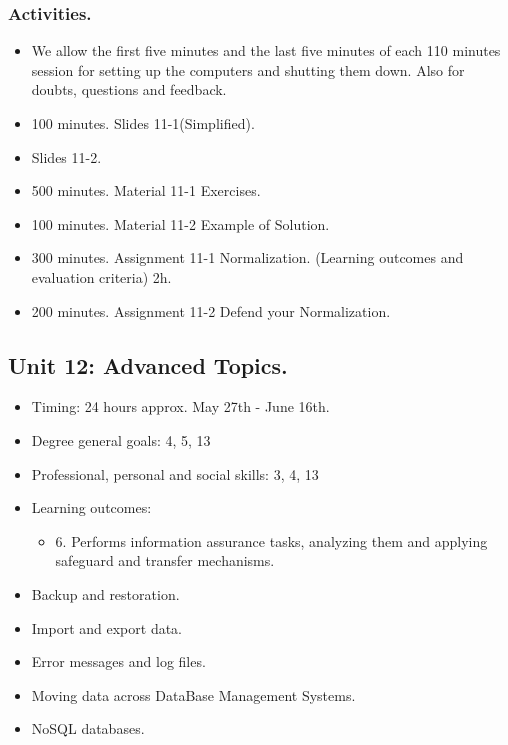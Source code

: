 \documentclass[catalan, a4paper, 12pt, titlepage]{article}
\begin{document}
  \subsubsection{Activities.}
  \begin{itemize}
          \item We allow the first five minutes and the last five minutes of each 110 minutes session for setting up the computers and shutting them down. Also for doubts, questions and feedback.
	  \item 100 minutes. Slides 11-1(Simplified).
	  \item Slides 11-2.
	  \item 500 minutes. Material 11-1 Exercises.
	  \item 100 minutes. Material 11-2 Example of Solution.
	  \item 300 minutes. Assignment 11-1 Normalization. (\faGraduationCap Learning outcomes and evaluation criteria) 2h.
	  \item 200 minutes. Assignment 11-2 Defend your Normalization.
  \end{itemize}


  \subsection{Unit 12: Advanced Topics.}

  \begin{itemize}
	\item Timing: 24 hours approx. May 27th - June 16th.
	\item Degree general goals: 4, 5, 13
	\item Professional, personal and social skills: 3, 4, 13
	\item Learning outcomes: 
		\begin{itemize}
			\item 6. Performs information assurance tasks, analyzing them and applying safeguard and transfer mechanisms.
		\end{itemize}
  \end{itemize}

  \begin{itemize}
	\item Backup and restoration.
	\item Import and export data.
	\item Error messages and log files.
	\item Moving data across DataBase Management Systems.
	\item NoSQL databases.
  \end{itemize}
\end{document}
